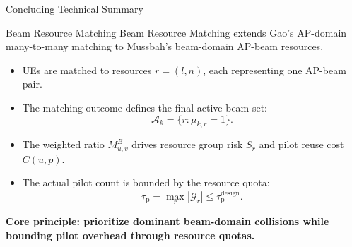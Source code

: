 \documentclass[10pt,aspectratio=169]{beamer}
\newcommand{\taup}{\tau_{\mathrm{p}}}
\newcommand{\taudesign}{\tau_{\mathrm{p}}^{\mathrm{design}}}
\newcommand{\BRM}{Beam Resource Matching}
\newenvironment{tightitemize}{%
    \begin{itemize}
        \setlength{\itemsep}{2pt}
        \setlength{\parskip}{0pt}
        \setlength{\parsep}{0pt}
}{%
    \end{itemize}
}
\begin{document}
\begin{frame}{Concluding Technical Summary}
    \small
    \begin{block}{Beam Resource Matching}
        \BRM{} extends Gao's AP-domain many-to-many matching to Mussbah's beam-domain AP-beam resources.
    \end{block}

    \vspace{0.6em}
    \begin{tightitemize}
        \item UEs are matched to resources \(r=(l,n)\), each representing one AP-beam pair.
        \item The matching outcome defines the final active beam set:
        \[
            \mathcal{A}_k=\{r:\mu_{k,r}=1\}.
        \]
        \item The weighted ratio \(M_{u,v}^{B}\) drives resource group risk \(S_r\) and pilot reuse cost \(C(u,p)\).
        \item The actual pilot count is bounded by the resource quota:
        \[
            \taup = \max_r |\mathcal{G}_r| \le \taudesign.
        \]
    \end{tightitemize}

    \vspace{0.5em}
    \begin{center}
        \textbf{Core principle: prioritize dominant beam-domain collisions while bounding pilot overhead through resource quotas.}
    \end{center}
\end{frame}
\end{document}
